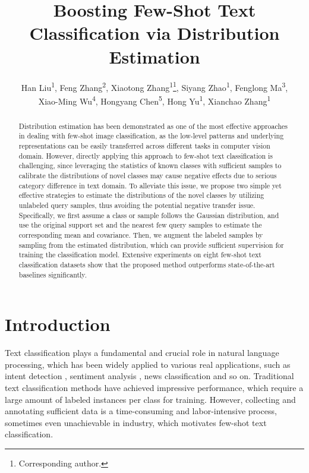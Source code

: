 \documentclass[letterpaper]{article} %
\title{Boosting Few-Shot Text Classification via Distribution Estimation}
\author {
    Han Liu\textsuperscript{\rm 1},
    Feng Zhang\textsuperscript{\rm 2},
    Xiaotong Zhang\textsuperscript{\rm 1}\thanks{Corresponding author.},
    Siyang Zhao\textsuperscript{\rm 1},
    Fenglong Ma\textsuperscript{\rm 3},\\
    Xiao-Ming Wu\textsuperscript{\rm 4},
    Hongyang Chen\textsuperscript{\rm 5},
    Hong Yu\textsuperscript{\rm 1},
    Xianchao Zhang\textsuperscript{\rm 1}
}
\begin{document}
\maketitle

\begin{abstract}
Distribution estimation has been demonstrated as one of the most effective approaches in dealing with few-shot image classification, as the low-level patterns and underlying representations can be easily transferred across different tasks in computer vision domain. However, directly applying this approach to few-shot text classification is challenging, since leveraging the statistics of known classes with sufficient samples to calibrate the distributions of novel classes may cause negative effects due to serious category difference in text domain. To alleviate this issue, we propose two simple yet effective strategies to estimate the distributions of the novel classes by utilizing unlabeled query samples, thus avoiding the potential negative transfer issue. Specifically, we first assume a class or sample follows the Gaussian distribution, and use the original support set and the nearest few query samples to estimate the corresponding mean and covariance. Then, we augment the labeled samples by sampling from the estimated distribution, which can provide sufficient supervision for training the classification model. Extensive experiments on eight few-shot text classification datasets show that the proposed method outperforms state-of-the-art baselines significantly.
\end{abstract}

\section{Introduction}
Text classification plays a fundamental and crucial role in natural language processing, which has been widely applied to various real applications, such as intent detection \cite{DBLP:conf/coling/LouvanM20}, sentiment analysis \cite{DBLP:journals/nca/KumarA21}, news classification \cite{DBLP:conf/icwsm/BozarthB20} and so on.
Traditional text classification methods \cite{DBLP:conf/acl/JohnsonZ17, DBLP:conf/naacl/DevlinCLT19} have achieved impressive performance, which require a large amount of
labeled instances per class for training. However, collecting and annotating sufficient data is a time-consuming and labor-intensive process, sometimes even unachievable in industry, which motivates few-shot text classification.
\end{document}
